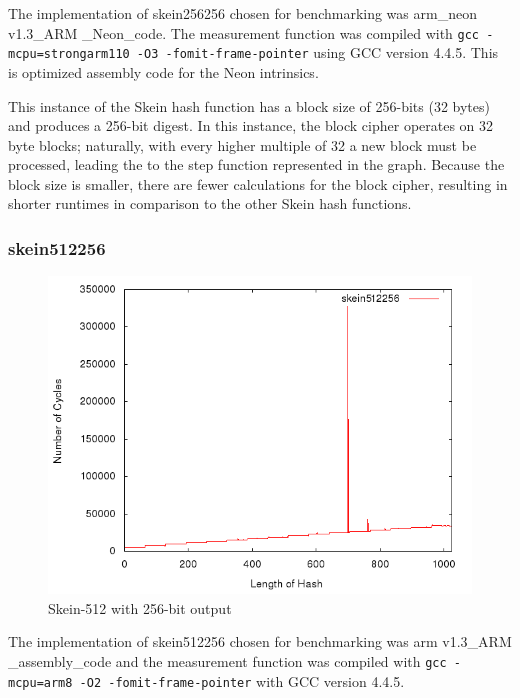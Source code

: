 \documentclass[10pt,a4paper]{article}
\begin{document}
The implementation of skein256256 chosen for benchmarking was arm\_neon
v1.3\_ARM \_Neon\_code. The measurement function was compiled with \texttt{gcc
-mcpu=strongarm110 -O3 -fomit-frame-pointer} using GCC version 4.4.5. This is
optimized assembly code for the Neon intrinsics. 

This instance of the Skein hash function has a block size of 256-bits (32 bytes) and produces a 256-bit digest.  In this instance, the block cipher operates on 32 byte blocks; naturally, with every higher multiple of 32 a new block must be processed, leading the to the step function represented in the graph.  Because the block size is smaller, there are fewer calculations for the block cipher, resulting in shorter runtimes in comparison to the other Skein hash functions.

\subsubsection{skein512256}

    \begin{figure}[H]
        \begin{center}
            \includegraphics[scale=0.5]{images/skein512256.png} 
            \caption{Skein-512 with 256-bit output}
        \end{center}
    \end{figure}

The implementation of skein512256 chosen for benchmarking was arm
v1.3\_ARM \_assembly\_code and the measurement function was compiled with
\texttt{gcc -mcpu=arm8 -O2 -fomit-frame-pointer} with GCC version 4.4.5.
\end{document}
